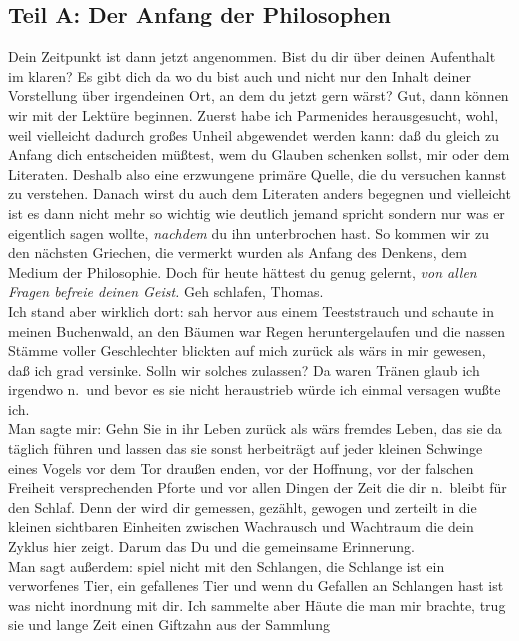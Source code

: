 \documentclass[
]{article}
\author{}
\date{\vspace{-2.5em}}
\begin{document}
\subsection{Teil A: Der Anfang der
Philosophen}\label{teil-a-der-anfang-der-philosophen}

Dein Zeitpunkt ist dann jetzt angenommen. Bist du dir über deinen
Aufenthalt im klaren? Es gibt dich da wo du bist auch und nicht nur den
Inhalt deiner Vorstellung über irgendeinen Ort, an dem du jetzt gern
wärst? Gut, dann können wir mit der Lektüre beginnen. Zuerst habe ich
Parmenides herausgesucht, wohl, weil vielleicht dadurch großes Unheil
abgewendet werden kann: daß du gleich zu Anfang dich entscheiden
müßtest, wem du Glauben schenken sollst, mir oder dem Literaten. Deshalb
also eine erzwungene primäre Quelle, die du versuchen kannst zu
verstehen. Danach wirst du auch dem Literaten anders begegnen und
vielleicht ist es dann nicht mehr so wichtig wie deutlich jemand spricht
sondern nur was er eigentlich sagen wollte, \emph{nachdem} du ihn
unterbrochen hast. So kommen wir zu den nächsten Griechen, die vermerkt
wurden als Anfang des Denkens, dem Medium der Philosophie. Doch für
heute hättest du genug gelernt, \emph{von allen Fragen befreie deinen
Geist. }Geh schlafen, Thomas.\\
Ich stand aber wirklich dort: sah hervor aus einem Teeststrauch und
schaute in meinen Buchenwald, an den Bäumen war Regen heruntergelaufen
und die nassen Stämme voller Geschlechter blickten auf mich zurück als
wärs in mir gewesen, daß ich grad versinke. Solln wir solches zulassen?
Da waren Tränen glaub ich irgendwo n.~und bevor es sie nicht heraustrieb
würde ich einmal versagen wußte ich.\\
Man sagte mir: Gehn Sie in ihr Leben zurück als wärs fremdes Leben, das
sie da täglich führen und lassen das sie sonst herbeiträgt auf jeder
kleinen Schwinge eines Vogels vor dem Tor draußen enden, vor der
Hoffnung, vor der falschen Freiheit versprechenden Pforte und vor allen
Dingen der Zeit die dir n.~bleibt für den Schlaf. Denn der wird dir
gemessen, gezählt, gewogen und zerteilt in die kleinen sichtbaren
Einheiten zwischen Wachrausch und Wachtraum die dein Zyklus hier zeigt.
Darum das Du und die gemeinsame Erinnerung.\\
Man sagt außerdem: spiel nicht mit den Schlangen, die Schlange ist ein
verworfenes Tier, ein gefallenes Tier und wenn du Gefallen an Schlangen
hast ist was nicht inordnung mit dir. Ich sammelte aber Häute die man
mir brachte, trug sie und lange Zeit einen Giftzahn aus der Sammlung
\end{document}
